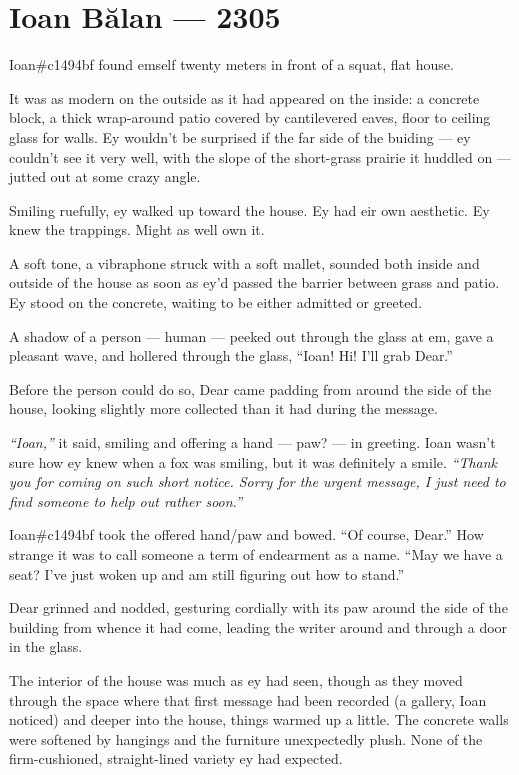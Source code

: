 \hypertarget{ioan-bux103lan-2305}{%
\chapter*{Ioan Bălan — 2305}\label{ioan-bux103lan-2305}}

Ioan\#c1494bf found emself twenty meters in front of a squat, flat house.

It was as modern on the outside as it had appeared on the inside: a concrete block, a thick wrap-around patio covered by cantilevered eaves, floor to ceiling glass for walls. Ey wouldn't be surprised if the far side of the buiding — ey couldn't see it very well, with the slope of the short-grass prairie it huddled on — jutted out at some crazy angle.

Smiling ruefully, ey walked up toward the house. Ey had eir own aesthetic. Ey knew the trappings. Might as well own it.

A soft tone, a vibraphone struck with a soft mallet, sounded both inside and outside of the house as soon as ey'd passed the barrier between grass and patio. Ey stood on the concrete, waiting to be either admitted or greeted.

A shadow of a person — human — peeked out through the glass at em, gave a pleasant wave, and hollered through the glass, ``Ioan! Hi! I'll grab Dear.''

Before the person could do so, Dear came padding from around the side of the house, looking slightly more collected than it had during the message.

\emph{``Ioan,''} it said, smiling and offering a hand — paw? — in greeting. Ioan wasn't sure how ey knew when a fox was smiling, but it was definitely a smile. \emph{``Thank you for coming on such short notice. Sorry for the urgent message, I just need to find someone to help out rather soon.''}

Ioan\#c1494bf took the offered hand/paw and bowed. ``Of course, Dear.'' How strange it was to call someone a term of endearment as a name. ``May we have a seat? I've just woken up and am still figuring out how to stand.''

Dear grinned and nodded, gesturing cordially with its paw around the side of the building from whence it had come, leading the writer around and through a door in the glass.

The interior of the house was much as ey had seen, though as they moved through the space where that first message had been recorded (a gallery, Ioan noticed) and deeper into the house, things warmed up a little. The concrete walls were softened by hangings and the furniture unexpectedly plush. None of the firm-cushioned, straight-lined variety ey had expected.

